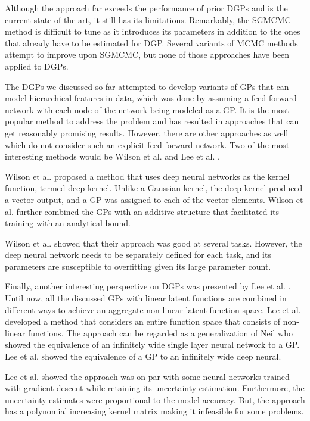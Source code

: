 \documentclass[letterpaper,11pt]{extarticle}
\begin{document}
Although the approach far exceeds the performance of prior DGPs and is the current state-of-the-art, it still has its limitations. Remarkably, the SGMCMC method is difficult to tune as it introduces its parameters in addition to the ones that already have to be estimated for DGP. Several variants of MCMC methods attempt to improve upon SGMCMC, but none of those approaches have been applied to DGPs. 

The DGPs we discussed so far attempted to develop variants of GPs that can model hierarchical features in data, which was done by assuming a feed forward network with each node of the network being modeled as a GP. It is the most popular method to address the problem and has resulted in approaches that can get reasonably promising results. However, there are other approaches as well which do not consider such an explicit feed forward network. Two of the most interesting methods would be Wilson et al. \cite{WilsonHSX16} and Lee et al. \cite{LeeBNSPD18}. 

Wilson et al. \cite{WilsonHSX16} proposed a method that uses deep neural networks as the kernel function, termed deep kernel. Unlike a Gaussian kernel, the deep kernel produced a vector output, and a GP was assigned to each of the vector elements. Wilson et al. further combined the GPs with an additive structure that facilitated its training with an analytical bound. 

Wilson et al. \cite{WilsonHSX16} showed that their approach was good at several tasks. However, the deep neural network needs to be separately defined for each task, and its parameters are susceptible to overfitting given its large parameter count.  

Finally, another interesting perspective on DGPs was presented by Lee et al. \cite{LeeBNSPD18}. Until now, all the discussed GPs with linear latent functions are combined in different ways to achieve an aggregate non-linear latent function space. Lee et al. developed a method that considers an entire function space that consists of non-linear functions. The approach can be regarded as a generalization of Neil \cite{Neal96} who showed the equivalence of an infinitely wide single layer neural network to a GP. Lee et al. showed the equivalence of a GP to an infinitely wide deep neural. 

Lee et al. \cite{LeeBNSPD18} showed the approach was on par with some neural networks trained with gradient descent while retaining its uncertainty estimation. Furthermore, the uncertainty estimates were proportional to the model accuracy. But, the approach has a polynomial increasing kernel matrix making it infeasible for some problems. 
 
\end{document}
